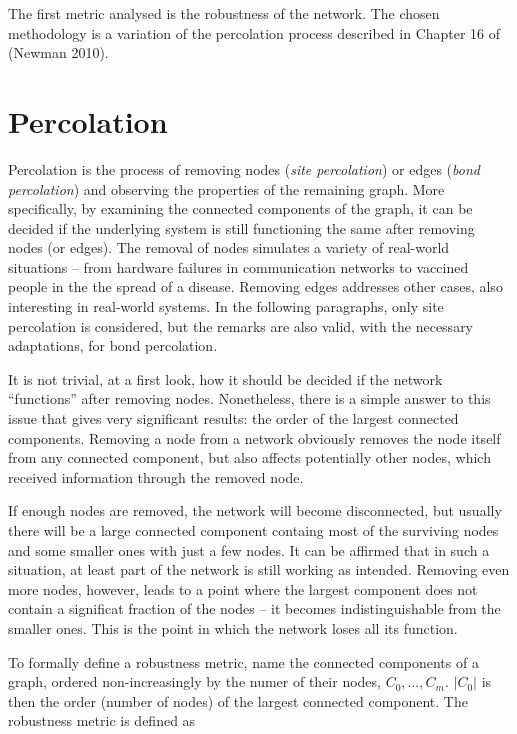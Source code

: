 \documentclass[oneside,openany]{memoir}
\begin{document}
The first metric analysed is the robustness of the network. The chosen
methodology is a variation of the percolation process described in
Chapter 16 of (Newman 2010).

\section{Percolation}\label{percolation}

Percolation is the process of removing nodes (\emph{site percolation})
or edges (\emph{bond percolation}) and observing the properties of the
remaining graph. More specifically, by examining the connected
components of the graph, it can be decided if the underlying system is
still functioning the same after removing nodes (or edges). The removal
of nodes simulates a variety of real-world situations -- from hardware
failures in communication networks to vaccined people in the the spread
of a disease. Removing edges addresses other cases, also interesting in
real-world systems. In the following paragraphs, only site percolation
is considered, but the remarks are also valid, with the necessary
adaptations, for bond percolation.

It is not trivial, at a first look, how it should be decided if the
network ``functions'' after removing nodes. Nonetheless, there is a
simple answer to this issue that gives very significant results: the
order of the largest connected components. Removing a node from a
network obviously removes the node itself from any connected component,
but also affects potentially other nodes, which received information
through the removed node.

If enough nodes are removed, the network will become disconnected, but
usually there will be a large connected component containg most of the
surviving nodes and some smaller ones with just a few nodes. It can be
affirmed that in such a situation, at least part of the network is still
working as intended. Removing even more nodes, however, leads to a point
where the largest component does not contain a significat fraction of
the nodes -- it becomes indistinguishable from the smaller ones. This is
the point in which the network loses all its function.

To formally define a robustness metric, name the connected components of
a graph, ordered non-increasingly by the numer of their nodes,
$C_0, \ldots, C_m$. $|C_0|$ is then the order (number of nodes) of the
largest connected component. The robustness metric is defined as
\end{document}
